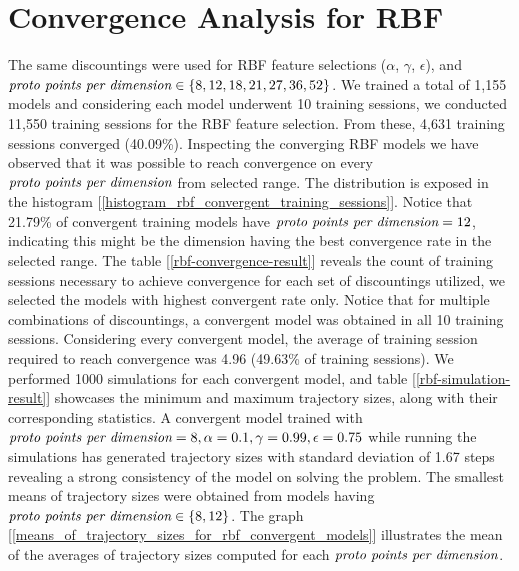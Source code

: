 \documentclass[10pt,twocolumn]{article}
\begin{document}
\section{Convergence Analysis for RBF}
The same discountings were used for RBF feature selections ($\alpha$, $\gamma$, $\epsilon$), and $\emph{proto points per dimension} \in \{8, 12, 18, 21, 27, 36, 52\}$.  
We trained a total of 1,155 models and considering each model underwent 10 training sessions, we conducted 11,550 training sessions for the RBF feature selection. 
From these, 4,631 training sessions converged (40.09\%). Inspecting the converging RBF models we have observed that it was possible to reach convergence on every $\emph{proto points per dimension}$ from selected range.
The distribution is exposed in the histogram [\ref{histogram_rbf_convergent_training_sessions}]. Notice that 21.79\% of convergent training models have $\emph{proto points per dimension} = 12$, indicating this might be the dimension having the best convergence rate in the selected range. The table [\ref{rbf-convergence-result}] reveals the count of training sessions necessary to achieve convergence for each set of discountings utilized,
we selected the models with highest convergent rate only. Notice that for multiple combinations of discountings, a convergent model was obtained in all 10 training sessions. Considering every convergent model, the average of training session required to reach convergence was 4.96 (49.63\% of training sessions). We performed 1000 simulations for each convergent model, and table [\ref{rbf-simulation-result}] showcases the minimum and maximum trajectory sizes, 
along with their corresponding statistics. A convergent model trained with $\emph{proto points per dimension} = 8, \alpha = 0.1, \gamma = 0.99, \epsilon = 0.75 $ while running the simulations has generated trajectory sizes 
with standard deviation of 1.67 steps revealing a strong consistency of the model on solving the problem. The smallest means of trajectory sizes were obtained from models having $\emph{proto points per dimension} \in \{8, 12\}$. 
The graph [\ref{means_of_trajectory_sizes_for_rbf_convergent_models}] illustrates the mean of the averages of trajectory sizes computed for each $\emph{proto points per dimension}$.
\end{document}
